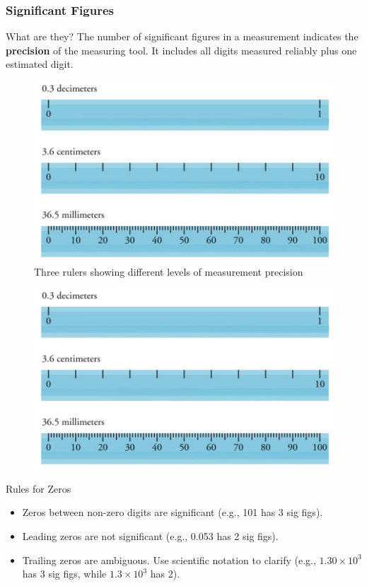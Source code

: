 \documentclass{beamer}
\begin{document}
\begin{frame}
    \frametitle{Significant Figures}
    \begin{block}{What are they?}
        The number of significant figures in a measurement indicates the \textbf{precision} of the measuring tool. It includes all digits measured reliably plus one estimated digit.
    \end{block}
    \pause

    \begin{figure}
        \centering
        \includegraphics[width=0.8\linewidth]{phys11-rulers-significant-figures.png}
        \caption{Three rulers showing different levels of measurement precision}
    \end{figure}
\end{frame}

\begin{frame}
     \begin{figure}
        \centering
        \includegraphics[width=0.8\linewidth]{phys11-rulers-significant-figures.png}
    \end{figure}
    \begin{block}{Rules for Zeros}
        \begin{itemize}
            \item Zeros between non-zero digits are significant (e.g., 101 has 3 sig figs).
            \pause
            \item Leading zeros are not significant (e.g., 0.053 has 2 sig figs).
            \pause
            \item Trailing zeros are ambiguous. Use scientific notation to clarify (e.g., \(1.30 \times 10^3\) has 3 sig figs, while \(1.3 \times 10^3\) has 2).
        \end{itemize}
    \end{block}
\end{frame}
\end{document}
